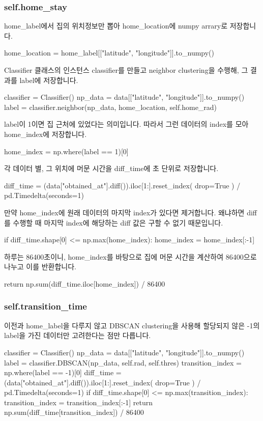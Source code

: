 \documentclass{oblivoir}
\begin{document}
  \subsubsection{self.home\_stay}
  home\_label에서 집의 위치정보만 뽑아 home\_location에 numpy arrary로 저장합니다.
  \begin{python}[labe={GPS_feature_29}]
    home_location = home_label[["latitude", "longitude"]].to_numpy()
  \end{python}
  Classifier 클래스의 인스턴스 classifier를 만들고 neighbor clustering을 수행해, 그 결과를 label에 저장합니다.
  \begin{python}[label={GPS_feature_30}]
    classifier = Classifier()
    np_data = data[["latitude", "longitude"]].to_numpy()
    label = classifier.neighbor(np_data, home_location, self.home_rad)
  \end{python}
  label이 1이면 집 근처에 있었다는 의미입니다. 따라서 그런 데이터의 index를 모아 home\_index에 저장합니다.
  \begin{python}[label={GPS_fearue_31}]
    home_index = np.where(label == 1)[0]
  \end{python}
  각 데이터 별, 그 위치에 머문 시간을 diff\_time에 초 단위로 저장합니다.
  \begin{python}[label={GPS_feature_32}]
    diff_time = (data["obtained_at"].diff()).iloc[1:].reset_index(
        drop=True
    ) / pd.Timedelta(seconds=1)
  \end{python}
  만약 home\_index에 원래 데이터의 마지막 index가 있다면 제거합니다.
  왜냐하면 diff를 수행할 때 마지막 index에 해당하는 diff 값은 구할 수 없기 때문입니다. 
  \begin{python}[label={GPS_feature_33}]
    if diff_time.shape[0] <= np.max(home_index):
      home_index = home_index[:-1]
  \end{python}
  하루는 86400초이니, home\_index를 바탕으로 집에 머문 시간을 계산하여 86400으로 나누고 이를 반환합니다.
  \begin{python}[label={GPS_feature_34}]
    return np.sum(diff_time.iloc[home_index]) / 86400
  \end{python}

  \subsubsection{self.transition\_time}
  이전과 home\_label을 다루지 않고 DBSCAN clustering을 사용해 할당되지 않은 -1의 label을 가진 데이터만 고려한다는 점만 다릅니다.
  \begin{python}[label={GPS_feature_35}]
    classifier = Classifier()
    np_data = data[["latitude", "longitude"]].to_numpy()
    label = classifier.DBSCAN(np_data, self.rad, self.thres)
    transition_index = np.where(label == -1)[0]
    diff_time = (data["obtained_at"].diff()).iloc[1:].reset_index(
        drop=True
    ) / pd.Timedelta(seconds=1)
    if diff_time.shape[0] <= np.max(transition_index):
        transition_index = transition_index[:-1]
    return np.sum(diff_time[transition_index]) / 86400
  \end{python}
\end{document}
